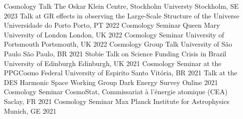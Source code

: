 

\begin{cvhonors}
  \cvhonor
    {Cosmology Talk } %
    {The Oskar Klein Centre, Stockholm Universty} %
    {Stockholm, SE} %
    {2023} %
  \cvhonor
    {Talk at GR effects in observing the Large-Scale Structure of the Universe } %
    {Universidade do Porto} %
    {Porto, PT} %
    {2022} %
  \cvhonor
    {Cosmology Seminar} %
    {Queen Mary University of London} %
    {London, UK} %
    {2022} %
  \cvhonor
    {Cosmology Seminar} %
    {University of Portsmouth} %
    {Portsmouth, UK} %
    {2022} %
  \cvhonor
    {Cosmology Group Talk} %
    {University of São Paulo} %
    {São Paulo, BR} %
    {2021} %
  \cvhonor
    {Stobie Talk on Science Funding Crisis in Brazil} %
    {University of Edinburgh} %
    {Edinburgh, UK} %
    {2021} %
  \cvhonor
    {Cosmology Seminar at the PPGCosmo} %
    {Federal University of Espirito Santo} %
    {Vitória, BR} %
    {2021} %
  \cvhonor
    {Talk at the DES Harmonic Space Working Group} %
    {Dark Energy Survey} %
    {Online} %
    {2021} %
  \cvhonor
    {Cosmology Seminar} %
    {CosmoStat, Commissariat à l'énergie atomique (CEA)} %
    {Saclay, FR} %
    {2021} %
  \cvhonor
    {Cosmology Seminar} %
    {Max Planck Institute for Astrophysics} %
    {Munich, GE} %
    {2021} %


\end{cvhonors}
